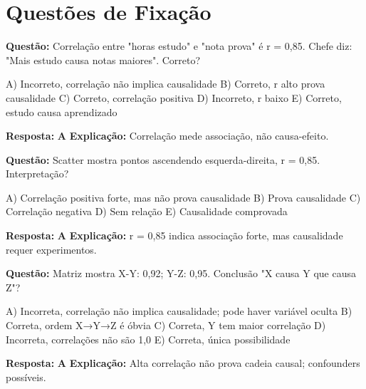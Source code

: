 \section*{Questões de Fixação}

\begin{SolvedBox}[title=Questão de Fixação 1 - Correlação ≠ Causalidade]
\textbf{Questão:} Correlação entre "horas estudo" e "nota prova" é r = 0,85. Chefe diz: "Mais estudo causa notas maiores". Correto?

A) Incorreto, correlação não implica causalidade  
B) Correto, r alto prova causalidade  
C) Correto, correlação positiva  
D) Incorreto, r baixo  
E) Correto, estudo causa aprendizado

\textbf{Resposta:} \textbf{A}  
\textbf{Explicação:} Correlação mede associação, não causa-efeito.
\end{SolvedBox}

\begin{SolvedBox}[title=Questão de Fixação 2 - Scatter Plot e Correlação]
\textbf{Questão:} Scatter mostra pontos ascendendo esquerda-direita, r = 0,85. Interpretação?

A) Correlação positiva forte, mas não prova causalidade  
B) Prova causalidade  
C) Correlação negativa  
D) Sem relação  
E) Causalidade comprovada

\textbf{Resposta:} \textbf{A}  
\textbf{Explicação:} r = 0,85 indica associação forte, mas causalidade requer experimentos.
\end{SolvedBox}

\begin{SolvedBox}[title=Questão de Fixação 3 - Matriz de Correlação]
\textbf{Questão:} Matriz mostra X-Y: 0,92; Y-Z: 0,95. Conclusão "X causa Y que causa Z"?

A) Incorreta, correlação não implica causalidade; pode haver variável oculta  
B) Correta, ordem X→Y→Z é óbvia  
C) Correta, Y tem maior correlação  
D) Incorreta, correlações não são 1,0  
E) Correta, única possibilidade

\textbf{Resposta:} \textbf{A}  
\textbf{Explicação:} Alta correlação não prova cadeia causal; confounders possíveis.
\end{SolvedBox}

